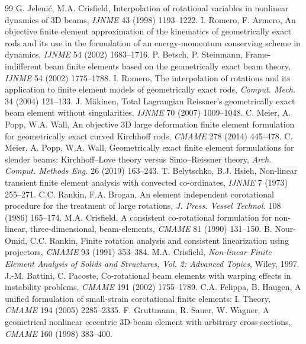 \documentclass[11pt,a4paper]{article}
\begin{document}
\begin{thebibliography}{99}
 G. Jelenić, M.A. Crisfield, Interpolation of rotational variables in nonlinear dynamics of 3D beams, \emph{IJNME} 43 (1998) 1193--1222.
 I. Romero, F. Armero, An objective finite element approximation of the kinematics of geometrically exact rods and its use in the formulation of an energy-momentum conserving scheme in dynamics, \emph{IJNME} 54 (2002) 1683--1716.
 P. Betsch, P. Steinmann, Frame-indifferent beam finite elements based on the geometrically exact beam theory, \emph{IJNME} 54 (2002) 1775--1788.
 I. Romero, The interpolation of rotations and its application to finite element models of geometrically exact rods, \emph{Comput. Mech.} 34 (2004) 121--133.
 J. Mäkinen, Total Lagrangian Reissner's geometrically exact beam element without singularities, \emph{IJNME} 70 (2007) 1009--1048.
 C. Meier, A. Popp, W.A. Wall, An objective 3D large deformation finite element formulation for geometrically exact curved Kirchhoff rods, \emph{CMAME} 278 (2014) 445--478.
 C. Meier, A. Popp, W.A. Wall, Geometrically exact finite element formulations for slender beams: Kirchhoff--Love theory versus Simo--Reissner theory, \emph{Arch. Comput. Methods Eng.} 26 (2019) 163--243.
 T. Belytschko, B.J. Hsieh, Non-linear transient finite element analysis with convected co-ordinates, \emph{IJNME} 7 (1973) 255--271.
 C.C. Rankin, F.A. Brogan, An element independent corotational procedure for the treatment of large rotations, \emph{J. Press. Vessel Technol.} 108 (1986) 165--174.
 M.A. Crisfield, A consistent co-rotational formulation for non-linear, three-dimensional, beam-elements, \emph{CMAME} 81 (1990) 131--150.
 B. Nour-Omid, C.C. Rankin, Finite rotation analysis and consistent linearization using projectors, \emph{CMAME} 93 (1991) 353--384.
 M.A. Crisfield, \emph{Non-linear Finite Element Analysis of Solids and Structures, Vol. 2: Advanced Topics}, Wiley, 1997.
 J.-M. Battini, C. Pacoste, Co-rotational beam elements with warping effects in instability problems, \emph{CMAME} 191 (2002) 1755--1789.
 C.A. Felippa, B. Haugen, A unified formulation of small-strain corotational finite elements: I. Theory, \emph{CMAME} 194 (2005) 2285--2335.
 F. Gruttmann, R. Sauer, W. Wagner, A geometrical nonlinear eccentric 3D-beam element with arbitrary cross-sections, \emph{CMAME} 160 (1998) 383--400.

\end{thebibliography}
\end{document}
